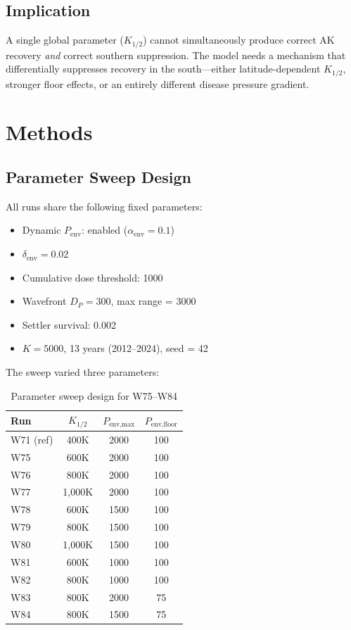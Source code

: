 \documentclass[11pt,a4paper]{article}
\begin{document}
\subsection*{Implication}
A single global parameter ($K_{1/2}$) cannot simultaneously produce correct AK recovery \emph{and} correct southern suppression. The model needs a mechanism that differentially suppresses recovery in the south---either latitude-dependent $K_{1/2}$, stronger floor effects, or an entirely different disease pressure gradient.


\section{Methods}

\subsection{Parameter Sweep Design}

All runs share the following fixed parameters:
\begin{itemize}[nosep]
    \item Dynamic $P_{\text{env}}$: enabled ($\alpha_{\text{env}}=0.1$)
    \item $\delta_{\text{env}} = 0.02$
    \item Cumulative dose threshold: 1000
    \item Wavefront $D_P = 300$, max range = 3000
    \item Settler survival: 0.002
    \item $K = 5000$, 13 years (2012--2024), seed = 42
\end{itemize}

The sweep varied three parameters:

\begin{table}[H]
\centering
\caption{Parameter sweep design for W75--W84}
\label{tab:params}
\begin{tabular}{lccc}
\toprule
\textbf{Run} & \textbf{$K_{1/2}$} & \textbf{$P_{\text{env,max}}$} & \textbf{$P_{\text{env,floor}}$} \\
\midrule
W71 (ref) & 400K & 2000 & 100 \\
\midrule
W75 & 600K & 2000 & 100 \\
W76 & 800K & 2000 & 100 \\
W77 & 1,000K & 2000 & 100 \\
W78 & 600K & 1500 & 100 \\
W79 & 800K & 1500 & 100 \\
W80 & 1,000K & 1500 & 100 \\
W81 & 600K & 1000 & 100 \\
W82 & 800K & 1000 & 100 \\
W83 & 800K & 2000 & 75 \\
W84 & 800K & 1500 & 75 \\
\bottomrule
\end{tabular}
\end{table}
\end{document}
